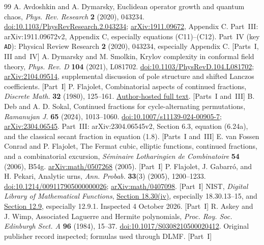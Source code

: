 \documentclass[11pt,letterpaper]{article}
\numberwithin{equation}{section}
\theoremstyle{remark}\newtheorem{remark}[theorem]{Remark}
\newcommand{\file}[1]{\nolinkurl{#1}}
\begin{document}
\begin{thebibliography}{99}
 A. Avdoshkin and A. Dymarsky, Euclidean operator growth and quantum chaos, \emph{Phys. Rev. Research} \textbf{2} (2020), 043234. \href{https://doi.org/10.1103/PhysRevResearch.2.043234}{doi:10.1103/PhysRevResearch.2.043234}; \href{https://arxiv.org/abs/1911.09672}{arXiv:1911.09672}, Appendix C. Part~III: arXiv:1911.09672v2, Appendix C, especially equations (C11)--(C12). Part~IV (key \file{AD}): Physical Review Research \textbf{2} (2020), 043234, especially Appendix C. [Parts~I, III and~IV]
 A. Dymarsky and M. Smolkin, Krylov complexity in conformal field theory, \emph{Phys. Rev. D} \textbf{104} (2021), L081702. \href{https://doi.org/10.1103/PhysRevD.104.L081702}{doi:10.1103/PhysRevD.104.L081702}; \href{https://arxiv.org/abs/2104.09514}{arXiv:2104.09514}, supplemental discussion of pole structure and shifted Lanczos coefficients. [Part~I]
 P. Flajolet, Combinatorial aspects of continued fractions, \emph{Discrete Math.} \textbf{32} (1980), 125--161. \href{https://algo.inria.fr/flajolet/Publications/Flajolet80b.pdf}{Author-hosted full text}. [Parts~I and~III]
 B. Deb and A. D. Sokal, Continued fractions for cycle-alternating permutations, \emph{Ramanujan J.} \textbf{65} (2024), 1013--1060. \href{https://doi.org/10.1007/s11139-024-00905-7}{doi:10.1007/s11139-024-00905-7}; \href{https://arxiv.org/abs/2304.06545}{arXiv:2304.06545}. Part~III: arXiv:2304.06545v2, Section 6.3, equation (6.24a), and the classical secant fraction in equation (1.8). [Parts~I and~III]
 E. van Fossen Conrad and P. Flajolet, The Fermat cubic, elliptic functions, continued fractions, and a combinatorial excursion, \emph{S\'eminaire Lotharingien de Combinatoire} \textbf{54} (2006), B54g. \href{https://arxiv.org/abs/math/0507268}{arXiv:math/0507268} (2005). [Part~I]
 P. Flajolet, J. Gabarr\'o, and H. Pekari, Analytic urns, \emph{Ann. Probab.} \textbf{33}(3) (2005), 1200--1233. \href{https://doi.org/10.1214/009117905000000026}{doi:10.1214/009117905000000026}; \href{https://arxiv.org/abs/math/0407098}{arXiv:math/0407098}. [Part~I]
 NIST, \emph{Digital Library of Mathematical Functions}, \href{https://dlmf.nist.gov/18.30}{Section 18.30(iv)}, especially 18.30.13--15, and \href{https://dlmf.nist.gov/12.9}{Section 12.9}, especially 12.9.1. Inspected 4 October 2026. [Part~I]
 R. Askey and J. Wimp, Associated Laguerre and Hermite polynomials, \emph{Proc. Roy. Soc. Edinburgh Sect. A} \textbf{96} (1984), 15--37. \href{https://doi.org/10.1017/S0308210500020412}{doi:10.1017/S0308210500020412}. Original publisher record inspected; formulas used through DLMF. [Part~I]

\end{thebibliography}
\end{document}
